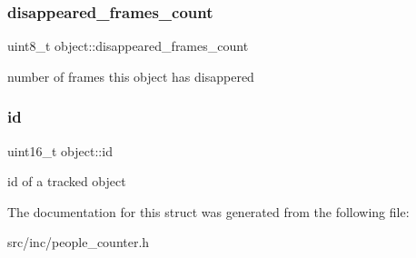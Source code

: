 \subsubsection{\texorpdfstring{disappeared\_frames\_count}{disappeared\_frames\_count}}
{\footnotesize\ttfamily uint8\+\_\+t object\+::disappeared\+\_\+frames\+\_\+count}

number of frames this object has disappered \mbox{\label{structobject_a58d1f0fec45caa726d12138380cfca64}} 
\subsubsection{\texorpdfstring{id}{id}}
{\footnotesize\ttfamily uint16\+\_\+t object\+::id}

id of a tracked object 

The documentation for this struct was generated from the following file\+:\begin{DoxyCompactItemize}
\item 
src/inc/people\+\_\+counter.\+h\end{DoxyCompactItemize}
